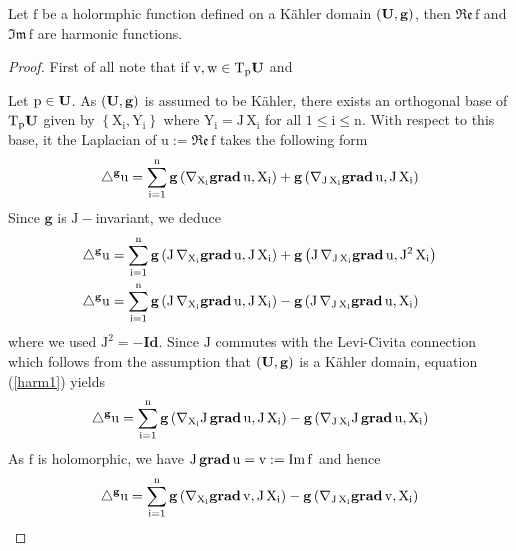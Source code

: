 \documentclass[10 pt,english]{smfart}
\newcommand{\g}{\mathrm{\mathbf{g}}}
\newcommand{\U}{{\bf{U}}}
\newcommand{\grad}{{\bf{grad}}}
\begin{document}
\begin{lemm}\label{harmonicity} Let $\mathrm{f}$ be a holormphic function defined on a K\"ahler domain $\mathrm{(\U,\g)}$, then $\mathrm{{\mathfrak{Re}}\,f}$ and $\mathrm{\mathfrak{Im}\, f}$ are harmonic functions.
\end{lemm}
\begin{proof} First of all note that if $\mathrm{v,w\in T_{p}\U}$ and $\mathrm{}$


Let $\mathrm{p\in \U}$. As $\mathrm{(\U,\g)}$ is assumed to be K\"ahler, there exists an orthogonal base of $\mathrm{T_{p}\U}$ given by $\mathrm{\left\{X_{i},Y_{i}\right\}}$ where $\mathrm{Y_{i}=J\,X_{i}}$ for all $\mathrm{1\leq i\leq n}$. With respect to this base, it the Laplacian of $\mathrm{u:={\mathfrak{Re}}\,f}$ takes the following form 
\begin{equation}
\mathrm{\triangle^{\g}u=\sum_{i=1}^{n}\g\left(\nabla_{X_{i}}\grad\,u,X_{i}\right)+\g\left(\nabla_{J\,X_{i}}\grad\,u,J\,X_{i}\right)} 
\end{equation} Since $\mathrm{\g}$ is $\mathrm{J-}$invariant, we deduce 
\begin{equation}\label{harm1}
\begin{split}
\mathrm{\triangle^{\g}u}&=\mathrm{\sum_{i=1}^{n}\g\left(J\,\nabla_{X_{i}}\grad\,u,J\,X_{i}\right)+\g\left(J\,\nabla_{J\,X_{i}}\grad\,u,J^{2}\,X_{i}\right)}\\
\mathrm{\triangle^{\g}u}&=\mathrm{\sum_{i=1}^{n}\g\left(J\,\nabla_{X_{i}}\grad\,u,J\,X_{i}\right)-\g\left(J\,\nabla_{J\,X_{i}}\grad\,u,X_{i}\right)}\\
\end{split}
\end{equation} where we used $\mathrm{J^{2}=-\mathbf{Id}}$.
Since $\mathrm{J}$ commutes with the Levi-Civita connection which follows from the assumption that $\mathrm{(\U,\g)}$ is a K\"ahler domain, equation (\ref{harm1}) yields
\begin{equation}\label{harm2}
\begin{split}
\mathrm{\triangle^{\g}u}&=\mathrm{\sum_{i=1}^{n}\g\left(\nabla_{X_{i}}J\,\grad\,u,J\,X_{i}\right)-\g\left(\nabla_{J\,X_{i}}J\,\grad\,u,X_{i}\right)}\\
\end{split}
\end{equation} As $\mathrm{f}$ is holomorphic, we have $\mathrm{J\,\grad \,u = v:= \mathfrak{Im}\,f}$ and hence 
\begin{equation}\label{harm3}
\mathrm{\triangle^{\g}u=\sum_{i=1}^{n}\g\left(\nabla_{X_{i}}\grad\,v,J\,X_{i}\right)-\g\left(\nabla_{J\,X_{i}}\grad\,v,X_{i}\right)}\\

\end{equation}
\end{proof}
\end{document}
